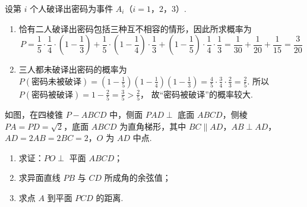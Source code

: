 \begin{solution}
设第 \(i\) 个人破译出密码为事件 \(A_i\)（\(i=1\)，\(2\)，\(3\)）.

\begin{enumerate}
\item 恰有二人破译出密码包括三种互不相容的情形，因此所求概率为
\[
P=\frac{1}{5}\cdot\frac{1}{4}\cdot\left(1-\frac{1}{3}\right)+\frac{1}{5}\cdot\left(1-\frac{1}{4}\right)\cdot\frac{1}{3}+\left(1-\frac{1}{5}\right)\cdot\frac{1}{4}\cdot\frac{1}{3}=\frac{1}{30}+\frac{1}{20}+\frac{1}{15}=\frac{3}{20}
\]
\item 三人都未破译出密码的概率为 \(P(\text{密码未被破译})=\left(1-\frac{1}{5}\right)\left(1-\frac{1}{4}\right)\left(1-\frac{1}{3}\right)=\frac{4}{5}\cdot\frac{3}{4}\cdot\frac{2}{3}=\frac{2}{5}\). 所以 \(P(\text{密码被破译})=1-\frac{2}{5}=\frac{3}{5}>\frac{2}{5}\)，
故“密码被破译”的概率较大.
\end{enumerate}
\end{solution}

\begin{problem}
如图，在四棱锥 \(P - ABCD\) 中，侧面 \(PAD \perp\) 底面 \(ABCD\)，侧棱 \(PA = PD = \sqrt{2}\)，底面 \(ABCD\) 为直角梯形，其中 \(BC \parallel AD\)，\(AB \perp AD\)，\(AD = 2AB = 2BC = 2\)，\(O\) 为 \(AD\) 中点.

\begin{enumerate}
\item 求证：\(PO \perp\) 平面 \(ABCD\)；
\item 求异面直线 \(PB\) 与 \(CD\) 所成角的余弦值；
\item 求点 \(A\) 到平面 \(PCD\) 的距离.
\end{enumerate}

\end{problem}

